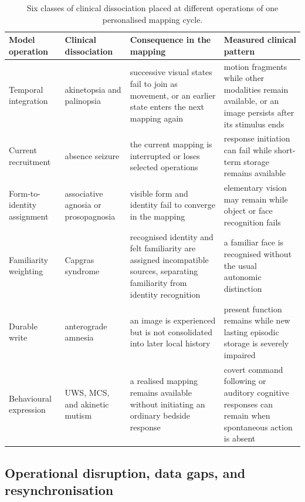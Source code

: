 \begin{table}[H]
\centering
\footnotesize
\renewcommand{\arraystretch}{0.97}
\begin{tabular}{@{}
>{\raggedright\arraybackslash}p{2.4cm}
>{\raggedright\arraybackslash}p{2.75cm}
>{\raggedright\arraybackslash}p{3.85cm}
>{\raggedright\arraybackslash}p{3.8cm}@{}}
\toprule
Model operation & Clinical dissociation & Consequence in the mapping & Measured clinical pattern \\
\midrule
Temporal integration
& akinetopsia and palinopsia
& successive visual states fail to join as movement, or an earlier state enters the next mapping again
& motion fragments while other modalities remain available, or an image persists after its stimulus ends \citep{zihl1983,stafuzza2018} \\[2pt]
Current recruitment
& absence seizure
& the current mapping is interrupted or loses selected operations
& response initiation can fail while short-term storage remains available \citep{vuilleumier2000} \\[2pt]
Form-to-identity assignment
& associative agnosia or prosopagnosia
& visible form and identity fail to converge in the mapping
& elementary vision may remain while object or face recognition fails \citep{delvenne2004} \\[2pt]
Familiarity weighting
& Capgras syndrome
& recognised identity and felt familiarity are assigned incompatible sources,
separating familiarity from identity recognition
& a familiar face is recognised without the usual autonomic distinction \citep{ellis1997} \\[2pt]
Durable write
& anterograde amnesia
& an image is experienced but is not consolidated into later local history
& present function remains while new lasting episodic storage is severely impaired \citep{scoville1957} \\[2pt]
Behavioural expression
& UWS, MCS, and akinetic mutism
& a realised mapping remains available without initiating an ordinary bedside response
& covert command following or auditory cognitive responses can remain when spontaneous action is absent \citep{monti2010,naccache2004} \\
\bottomrule
\end{tabular}
\caption{Six classes of clinical dissociation placed at different operations of one
personalised mapping cycle.}
\label{tab:state_classification}
\end{table}

\subsection{Operational disruption, data gaps, and resynchronisation}
\label{sec:reconstruction}

